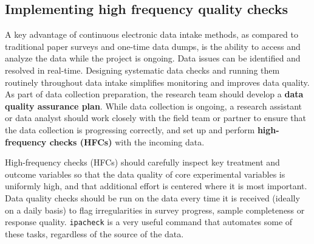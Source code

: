 \subsection{Implementing high frequency quality checks}

A key advantage of continuous electronic data intake methods,
as compared to traditional paper surveys and one-time data dumps,
is the ability to access and analyze the data while the project is ongoing.
Data issues can be identified and resolved in real-time.
Designing systematic data checks and running them routinely throughout data intake
simplifies monitoring and improves data quality.
As part of data collection preparation,
the research team should develop a \textbf{data quality assurance plan}.
While data collection is ongoing,
a research assistant or data analyst should work closely with the field team or partner
to ensure that the data collection is progressing correctly,
and set up and perform \textbf{high-frequency checks (HFCs)} with the incoming data.

High-frequency checks (HFCs) should carefully inspect key treatment and outcome variables
so that the data quality of core experimental variables is uniformly high,
and that additional effort is centered where it is most important.
Data quality checks should be run on the data every time it is received (ideally on a daily basis)
to flag irregularities in survey progress, sample completeness or response quality.
\texttt{ipacheck}
is a very useful command that automates some of these tasks,
regardless of the source of the data.

